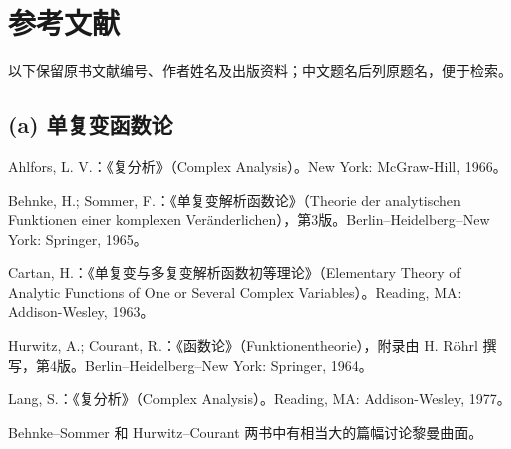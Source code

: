 \chapter*{参考文献}
以下保留原书文献编号、作者姓名及出版资料；中文题名后列原题名，便于检索。
\section*{(a) 单复变函数论}
\begin{description}[style=nextline,leftmargin=2em]
\item[{[1]}] Ahlfors, L. V.：《复分析》（Complex Analysis）。New York: McGraw-Hill, 1966。
\item[{[2]}] Behnke, H.; Sommer, F.：《单复变解析函数论》（Theorie der analytischen Funktionen einer komplexen Veränderlichen），第3版。Berlin--Heidelberg--New York: Springer, 1965。
\item[{[3]}] Cartan, H.：《单复变与多复变解析函数初等理论》（Elementary Theory of Analytic Functions of One or Several Complex Variables）。Reading, MA: Addison-Wesley, 1963。
\item[{[4]}] Hurwitz, A.; Courant, R.：《函数论》（Funktionentheorie），附录由 H. Röhrl 撰写，第4版。Berlin--Heidelberg--New York: Springer, 1964。
\item[{[5]}] Lang, S.：《复分析》（Complex Analysis）。Reading, MA: Addison-Wesley, 1977。
\end{description}
Behnke--Sommer 和 Hurwitz--Courant 两书中有相当大的篇幅讨论黎曼曲面。
